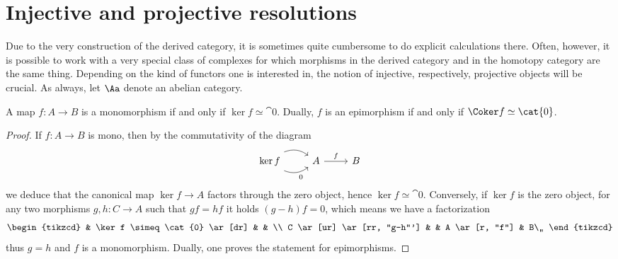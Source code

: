 
\section{Injective and projective resolutions}

Due to the very construction of the derived category, it is sometimes quite cumbersome to do explicit calculations there. Often, however, it is possible to work with a very special class of complexes for which morphisms in the derived category and in the homotopy category are the same thing. Depending on the kind of functors one is interested in, the notion of injective, respectively, projective objects will be crucial.
As always, let $\Aa$ denote an abelian category.

\begin{lemma}
    A map $f:A \to B$ is a monomorphism if and only if $\ker f \simeq \cat{0}$.
    Dually, $f$ is an epimorphism if and only if $\Coker f \simeq \cat{0}$.
    \begin{proof}
        If $f: A \to B$ is mono, 
        then by the commutativity of the diagram
        \begin{equation*}
            \begin{tikzcd}
            \ker f \ar[r, bend left, shift left=0.3ex] \ar[r, bend right, shift right=0.3ex, "0"'] 
            & A \ar[r, "f"] & B
            \end{tikzcd}
        \end{equation*}
        we deduce that the canonical map $\ker f \to A$
        factors through the zero object, hence $\ker f \simeq \cat{0}$.
        Conversely, if $\ker f$ is the zero object, for any two morphisms
        $g,h:C \to A$ such that $gf=hf$ it holds $(g-h)f=0$,
        which means we have a factorization
        \begin{equation*}
            \begin{tikzcd}
                & \ker f \simeq \cat{0} \ar[dr] & & \\
                C \ar[ur] \ar[rr, "g-h"'] & & A \ar[r, "f"] & B\,,
            \end{tikzcd}
        \end{equation*}
        thus $g=h$ and $f$ is a monomorphism. Dually, one proves the statement
        for epimorphisms.
    \end{proof}
\end{lemma}

